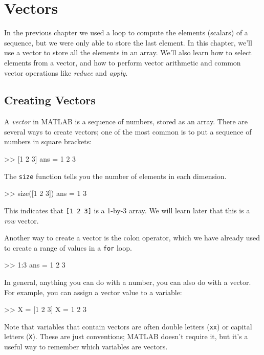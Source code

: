\documentclass[../../book.tex]{subfiles}
\begin{document}
\chapter{Vectors}
\label{vectors}

In the previous chapter we used a loop to compute the elements (scalars) of a sequence, but we were only able to store the last element.  In this chapter, we'll use a vector to store all the elements in an array.
We'll also learn how to select elements from a vector, and how to perform vector arithmetic and common vector operations like \emph{reduce} and \emph{apply}.

\section{Creating Vectors}


A \emph{vector} in MATLAB is a sequence of numbers, stored as an array.
There are several ways to create vectors; one of the most common is
to put a sequence of numbers in square brackets:

\begin{code}
>> [1 2 3]
ans = 1     2     3
\end{code}

The \lstinline{size} function tells you the number of elements in each dimension.

\begin{code}
>> size([1 2 3])
ans =
    1     3
\end{code}
This indicates that \lstinline{[1 2 3]} is a 1-by-3 array.  We will learn later that this is a \emph{row} vector.


Another way to create a vector is the colon operator, which we have already used to create a range of values in a \lstinline{for} loop.

\begin{code}
>> 1:3
ans = 1     2     3
\end{code}

In general, anything you can do with a number, you can also do with
a vector.  For example, you can assign a vector value to a variable:

\begin{code}
>> X = [1 2 3]
X = 1     2     3
\end{code}

Note that variables that contain vectors are often double letters (\lstinline{xx}) or capital letters (\lstinline{X}).
These are just conventions; MATLAB doesn't require it, but it's a useful way to remember which variables are vectors.
\end{document}
